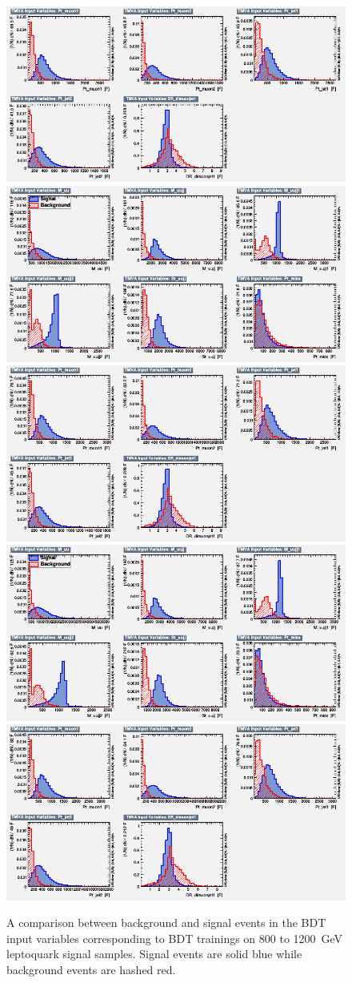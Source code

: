 \begin{figure}[H]
    {\includegraphics[width=.49\textwidth]{Images/Analysis/Results_LQToBMu_pair_uubj_BDTG_FullRun2_2023_01_25_020318/1000/variables_id_c2.png}}
    {\includegraphics[width=.49\textwidth]{Images/Analysis/Results_LQToBMu_pair_uubj_BDTG_FullRun2_2023_01_25_020318/1100/variables_id_c1.png}}
    {\includegraphics[width=.49\textwidth]{Images/Analysis/Results_LQToBMu_pair_uubj_BDTG_FullRun2_2023_01_25_020318/1100/variables_id_c2.png}}
    {\includegraphics[width=.49\textwidth]{Images/Analysis/Results_LQToBMu_pair_uubj_BDTG_FullRun2_2023_01_25_020318/1200/variables_id_c1.png}}
    {\includegraphics[width=.49\textwidth]{Images/Analysis/Results_LQToBMu_pair_uubj_BDTG_FullRun2_2023_01_25_020318/1200/variables_id_c2.png}}
    \caption{A comparison between background and signal events in the BDT input variables corresponding to BDT trainings on 800 to \SI{1200}{GeV} leptoquark signal samples. Signal events are solid blue while background events are hashed red.}
    \label{figapp:variables2}
\end{figure}


